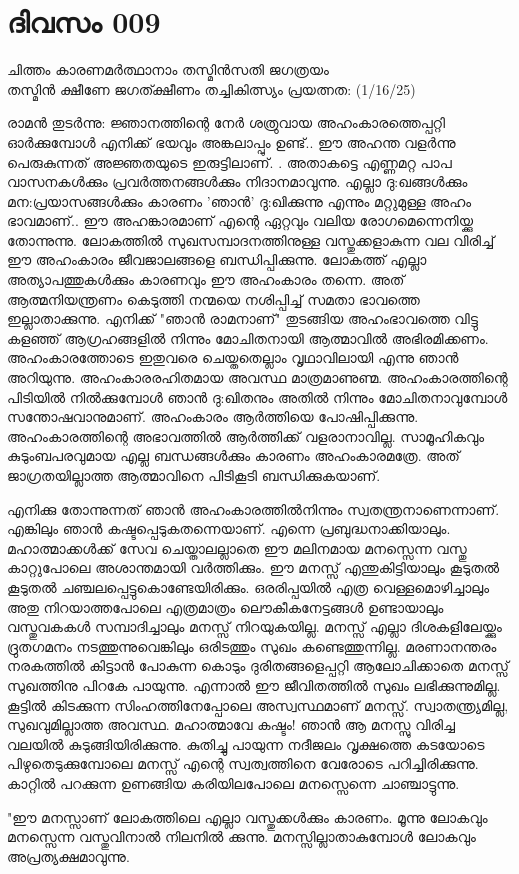 \newpage
\section{ദിവസം 009}

\begin{center}
ചിത്തം കാരണമർത്ഥാനാം തസ്മിൻസതി ജഗത്രയം\\
തസ്മിൻ ക്ഷീണേ ജഗത്ക്ഷീണം തച്ചികിത്സ്യം പ്രയത്നത: (1/16/25)\\
\end{center}

രാമന്‍ തുടര്‍ന്നു: ജ്ഞാനത്തിന്റെ നേര്‍ ശത്രുവായ അഹംകാരത്തെപ്പറ്റി ഓര്‍ക്കുമ്പോള്‍ എനിക്ക്‌ ഭയവും അങ്കലാപ്പും ഉണ്ട്‌.. ഈ അഹന്ത വളര്‍ന്നു പെരുകുന്നത്‌ അജ്ഞതയുടെ ഇരുട്ടിലാണ്‌. . അതാകട്ടെ എണ്ണമറ്റ പാപ വാസനകള്‍ക്കും പ്രവര്‍ത്തനങ്ങള്‍ക്കും നിദാനമാവുന്നു. എല്ലാ ദു:ഖങ്ങള്‍ക്കും മന:പ്രയാസങ്ങള്‍ക്കും കാരണം 'ഞാന്‍' ദു:ഖിക്കുന്നു എന്നും മറ്റുമുള്ള അഹം ഭാവമാണ്‌.. ഈ അഹങ്കാരമാണ്‌ എന്റെ ഏറ്റവും വലിയ രോഗമെന്നെനിയ്ക്കു തോന്നുന്നു. ലോകത്തില്‍ സുഖസമ്പാദനത്തിനുള്ള വസ്തുക്കളാകുന്ന വല വിരിച്ച്‌ ഈ അഹംകാരം ജീവജാലങ്ങളെ ബന്ധിപ്പിക്കുന്നു. ലോകത്ത്‌ എല്ലാ അത്യാപത്തുകള്‍ക്കും കാരണവും ഈ അഹംകാരം തന്നെ. അത്‌ ആത്മനിയന്ത്രണം കെടുത്തി നന്മയെ നശിപ്പിച്ച്‌ സമതാ ഭാവത്തെ ഇല്ലാതാക്കുന്നു. എനിക്ക്‌ "ഞാന്‍ രാമനാണ്‌" തുടങ്ങിയ അഹംഭാവത്തെ വിട്ടു കളഞ്ഞ്‌ ആഗ്രഹങ്ങളില്‍ നിന്നും മോചിതനായി ആത്മാവില്‍ അഭിരമിക്കണം. 
അഹംകാരത്തോടെ ഇതുവരെ ചെയ്തതെല്ലാം വൃഥാവിലായി എന്നു ഞാന്‍ അറിയുന്നു. അഹംകാരരഹിതമായ അവസ്ഥ മാത്രമാണുണ്മ. അഹംകാരത്തിന്റെ പിടിയില്‍ നില്‍ക്കുമ്പോള്‍ ഞാന്‍ ദു:ഖിതനും അതില്‍ നിന്നും മോചിതനാവുമ്പോള്‍ സന്തോഷവാനുമാണ്‌. അഹംകാരം ആര്‍ത്തിയെ പോഷിപ്പിക്കുന്നു. അഹംകാരത്തിന്റെ അഭാവത്തില്‍ ആര്‍ത്തിക്ക്‌ വളരാനാവില്ല. സാമൂഹികവും കുടുംബപരവുമായ എല്ല ബന്ധങ്ങള്‍ക്കും കാരണം അഹംകാരമത്രേ. അത്‌ ജാഗ്രതയില്ലാത്ത ആത്മാവിനെ പിടികൂടി ബന്ധിക്കുകയാണ്‌. 


എനിക്കു തോന്നുന്നത്‌ ഞാന്‍ അഹംകാരത്തില്‍നിന്നും സ്വതന്ത്രനാണെന്നാണ്‌. എങ്കിലും ഞാന്‍ കഷ്ടപ്പെടുകതന്നെയാണ്‌. എന്നെ പ്രബുദ്ധനാക്കിയാലും. മഹാത്മാക്കള്‍ക്ക്‌ സേവ ചെയ്താലല്ലാതെ ഈ മലിനമായ മനസ്സെന്ന വസ്തു കാറ്റുപോലെ അശാന്തമായി വര്‍ത്തിക്കും. ഈ മനസ്സ്‌ എന്തുകിട്ടിയാലും കൂടുതല്‍ കൂടുതല്‍ ചഞ്ചലപ്പെട്ടുകൊണ്ടേയിരിക്കും. ഒരരിപ്പയില്‍ എത്ര വെള്ളമൊഴിച്ചാലും അതു നിറയാത്തപോലെ എത്രമാത്രം ലൌകീകനേട്ടങ്ങള്‍ ഉണ്ടായാലും വസ്തുവകകള്‍ സമ്പാദിച്ചാലും മനസ്സ്‌ നിറയുകയില്ല. മനസ്സ്‌ എല്ലാ ദിശകളിലേയ്ക്കും ദ്രുതഗമനം നടത്തുന്നുവെങ്കിലും ഒരിടത്തും സുഖം കണ്ടെത്തുന്നില്ല. മരണാനന്തരം നരകത്തില്‍ കിട്ടാന്‍ പോകുന്ന കൊടും ദുരിതങ്ങളെപ്പറ്റി ആലോചിക്കാതെ മനസ്സ്‌ സുഖത്തിനു പിറകേ പായുന്നു. എന്നാല്‍ ഈ ജീവിതത്തില്‍ സുഖം ലഭിക്കുന്നുമില്ല. കൂട്ടില്‍ കിടക്കുന്ന സിംഹത്തിനേപ്പോലെ അസ്വസ്ഥമാണ്‌ മനസ്സ്‌. സ്വാതന്ത്ര്യമില്ല, സുഖവുമില്ലാത്ത അവസ്ഥ. മഹാത്മാവേ കഷ്ടം! ഞാന്‍ ആ മനസ്സു വിരിച്ച വലയില്‍ കുടുങ്ങിയിരിക്കുന്നു. കുതിച്ചു പായുന്ന നദീജലം വൃക്ഷത്തെ കടയോടെ പിഴുതെടുക്കുമ്പോലെ മനസ്സ്‌ എന്റെ സ്വത്വത്തിനെ വേരോടെ പറിച്ചിരിക്കുന്നു. കാറ്റില്‍ പറക്കുന്ന ഉണങ്ങിയ കരിയിലപോലെ മനസ്സെന്നെ ചാഞ്ചാട്ടുന്നു.

"ഈ മനസ്സാണ്‌ ലോകത്തിലെ എല്ലാ വസ്തുക്കള്‍ക്കും കാരണം. മൂന്നു ലോകവും മനസ്സെന്ന വസ്തുവിനാല്‍ നിലനില്‍ ക്കുന്നു. മനസ്സില്ലാതാകുമ്പോള്‍ ലോകവും അപ്രത്യക്ഷമാവുന്നു.
